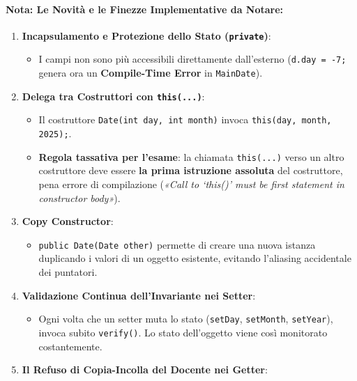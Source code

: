 \documentclass[11pt,a4paper]{article}
\newcommand{\passthrough}[1]{#1}
\providecommand{\tightlist}{\setlength{\itemsep}{0pt}\setlength{\parskip}{0pt}}
\begin{document}
\paragraph{Nota: Le Novità e le Finezze Implementative da
Notare:}\label{nota-le-novituxe0-e-le-finezze-implementative-da-notare}

\begin{enumerate}
\def\labelenumi{\arabic{enumi}.}
\item
  \textbf{Incapsulamento e Protezione dello Stato
  (\passthrough{\lstinline!private!})}:

  \begin{itemize}
  \tightlist
  \item
    I campi non sono più accessibili direttamente dall'esterno
    (\passthrough{\lstinline!d.day = -7;!} genera ora un
    \textbf{Compile-Time Error} in \passthrough{\lstinline!MainDate!}).
  \end{itemize}
\item
  \textbf{Delega tra Costruttori con
  \passthrough{\lstinline!this(...)!}}:

  \begin{itemize}
  \tightlist
  \item
    Il costruttore \passthrough{\lstinline!Date(int day, int month)!}
    invoca \passthrough{\lstinline!this(day, month, 2025);!}.
  \item
    \textbf{Regola tassativa per l'esame}: la chiamata
    \passthrough{\lstinline!this(...)!} verso un altro costruttore deve
    essere \textbf{la prima istruzione assoluta} del costruttore, pena
    errore di compilazione (\emph{«Call to `this()' must be first
    statement in constructor body»}).
  \end{itemize}
\item
  \textbf{Copy Constructor}:

  \begin{itemize}
  \tightlist
  \item
    \passthrough{\lstinline!public Date(Date other)!} permette di creare
    una nuova istanza duplicando i valori di un oggetto esistente,
    evitando l'aliasing accidentale dei puntatori.
  \end{itemize}
\item
  \textbf{Validazione Continua dell'Invariante nei Setter}:

  \begin{itemize}
  \tightlist
  \item
    Ogni volta che un setter muta lo stato
    (\passthrough{\lstinline!setDay!},
    \passthrough{\lstinline!setMonth!},
    \passthrough{\lstinline!setYear!}), invoca subito
    \passthrough{\lstinline!verify()!}. Lo stato dell'oggetto viene così
    monitorato costantemente.
  \end{itemize}
\item
  \textbf{Il Refuso di Copia-Incolla del Docente nei Getter}:


\end{enumerate}
\end{document}
